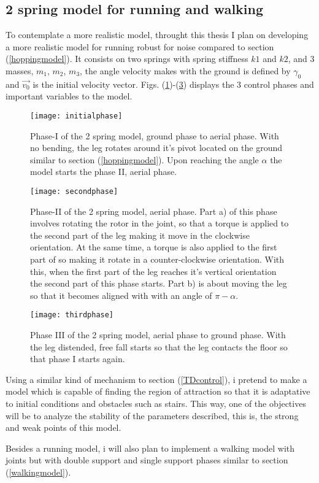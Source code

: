 \subsection{2 spring model for running and walking}\label{2springssection}
To contemplate a more realistic model, throught this thesis I plan on developing a more realistic model for running robust for noise compared to section (\ref{hoppingmodel}). It consists on two springs with spring stiffness $k1$ and $k2$, and 3 masses, $m_1$, $m_2$, $m_3$, the angle velocity makes with the ground is defined by $\gamma_0$ and $\vec{v_0}$ is the initial velocity vector. Figs. (\ref{2spring1})-(\ref{2spring3}) displays the 3 control phases and important variables to the model. 

\begin{figure}[H]
   \centering
   \texttt{[image: initialphase]}
   \caption{Phase-I of the 2 spring model, ground phase to aerial phase. With no bending, the leg rotates around it's pivot located on the ground similar to section (\ref{hoppingmodel}). Upon reaching the angle $\alpha$ the model starts the phase II, aerial phase.}
   \label{2spring1}
  \end{figure}

\begin{figure}[H]
  \centering
  \texttt{[image: secondphase]}
  \caption{Phase-II of the 2 spring model, aerial phase. Part a) of this phase involves rotating the rotor in the joint, so that a torque is applied to the second part of the leg making it move in the clockwise orientation. At the same time, a torque is also applied to the first part of so making it rotate in a counter-clockwise orientation. With this, when the first part of the leg reaches it's vertical orientation the second part of this phase starts. Part b) is about moving the leg so that it becomes aligned with with an angle of $\pi-\alpha$. }
  \label{2spring2}
\end{figure}

\begin{figure}[H]
  \centering
  \texttt{[image: thirdphase]}
  \caption{Phase III of the 2 spring model, aerial phase to ground phase. With the leg distended, free fall starts so that the leg contacts the floor so that phase I starts again.}
     \label{2spring3}
  \end{figure}

Using a similar kind of mechanism to section (\ref{TDcontrol}), i pretend to make a model  which is capable of finding the region of attraction so that it is adaptative to initial conditions and obstacles such as stairs. This way, one of the objectives will be to analyze the stability of the parameters described, this is, the strong and weak points of this model.

Besides a running model, i will also plan to implement a walking model with joints but with double support and single support phases similar to section (\ref{walkingmodel}). 
